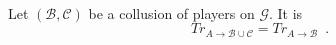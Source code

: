 \begin{theorem} \ \\
  \label{sybil}
  Let $\left(\mathcal{B}, \mathcal{C}\right)$ be a collusion of players on $\mathcal{G}$. It is
  \begin{equation*}
     Tr_{A \rightarrow \mathcal{B} \cup \mathcal{C}} = Tr_{A \rightarrow \mathcal{B}} \enspace.
  \end{equation*}
\end{theorem}
